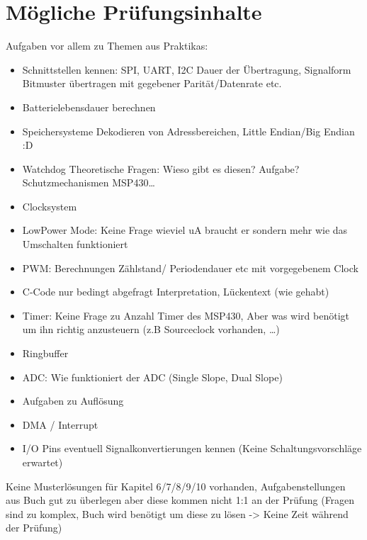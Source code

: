 \section*{Mögliche Prüfungsinhalte}
Aufgaben vor allem zu Themen aus Praktikas:
\begin{itemize}
\item Schnittstellen kennen: SPI, UART, I2C
\subitem Dauer der Übertragung, Signalform Bitmuster übertragen mit gegebener Parität/Datenrate etc.

\item Batterielebensdauer berechnen

\item Speichersysteme
\subitem Dekodieren von Adressbereichen, Little Endian/Big Endian :D

\item Watchdog
\subitem Theoretische Fragen: Wieso gibt es diesen? Aufgabe? Schutzmechanismen MSP430…

\item Clocksystem

\item LowPower Mode:
\subitem Keine Frage wieviel uA braucht er sondern mehr wie das Umschalten funktioniert

\item PWM:
\subitem Berechnungen Zählstand/ Periodendauer etc mit vorgegebenem Clock

\item C-Code nur bedingt abgefragt
\subitem Interpretation, Lückentext (wie gehabt)

\item Timer:
\subitem Keine Frage zu Anzahl Timer des MSP430, Aber was wird benötigt um ihn richtig anzusteuern (z.B Sourceclock vorhanden, …)

\item Ringbuffer

\item ADC:
\subitem Wie funktioniert der ADC (Single Slope, Dual Slope)

\item Aufgaben zu Auflösung

\item DMA / Interrupt

\item I/O Pins eventuell Signalkonvertierungen kennen (Keine Schaltungsvorschläge erwartet)
\end{itemize}
Keine Musterlösungen für Kapitel 6/7/8/9/10 vorhanden, Aufgabenstellungen aus Buch gut zu überlegen aber diese kommen nicht 1:1 an der Prüfung (Fragen sind zu komplex, Buch wird benötigt um diese zu lösen -> Keine Zeit während der Prüfung)


















